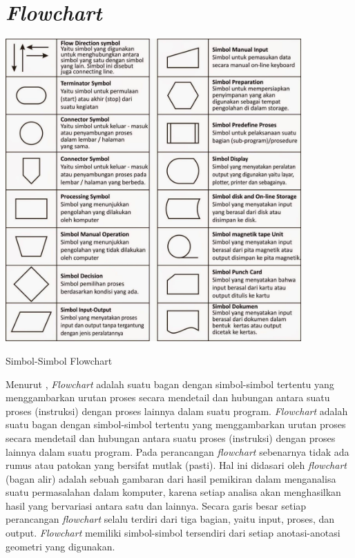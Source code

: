 \section{\textit{Flowchart}}
\begin{afigure}
    \includegraphics[width=0.85\textwidth, center]{images/Picture11.png}
    \caption{Simbol-Simbol Flowchart}
    \label{fig:flowchart} 
\end{afigure}
Menurut \cite{cmlabs2023},\textit{ Flowchart} adalah suatu bagan dengan simbol-simbol tertentu yang menggambarkan urutan proses secara mendetail dan hubungan antara suatu proses (instruksi) dengan proses lainnya dalam suatu program.
\textit{Flowchart} adalah suatu bagan dengan simbol-simbol tertentu yang menggambarkan urutan proses secara mendetail dan hubungan antara suatu proses (instruksi) dengan proses lainnya dalam suatu program. Pada perancangan \textit{flowchart} sebenarnya tidak ada rumus atau patokan yang bersifat mutlak (pasti). Hal ini didasari oleh \textit{flowchart} (bagan alir) adalah sebuah gambaran dari hasil pemikiran dalam menganalisa suatu permasalahan dalam komputer, karena setiap analisa akan menghasilkan hasil yang bervariasi antara satu dan lainnya. Secara garis besar setiap perancangan \textit{flowchart} selalu terdiri dari tiga bagian, yaitu input, proses, dan output. \textit{Flowchart} memiliki simbol-simbol tersendiri dari setiap anotasi-anotasi geometri yang digunakan.

